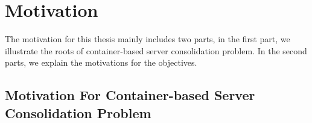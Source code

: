 
\section{Motivation}

The motivation for this thesis mainly includes two parts, in the first part, we illustrate the roots of container-based server consolidation problem. In the second parts, we explain the motivations for the objectives.

\subsection{Motivation For Container-based Server Consolidation Problem}


